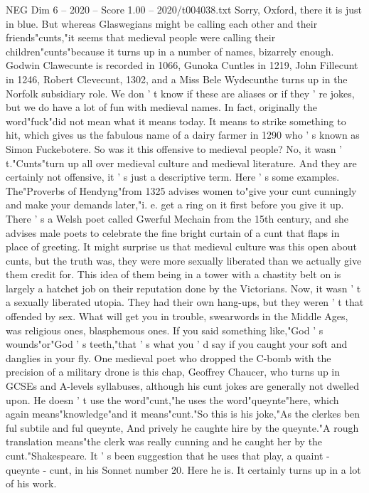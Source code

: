 \begin{textsample}{NEG Dim 6 – 2020 – Score 1.00 – 2020/t004038.txt}
Sorry, Oxford, there it is just in blue.
But whereas Glaswegians might be calling each other and their friends"cunts,"it seems that medieval people were calling their children"cunts"because it turns up in a number of names, bizarrely enough.
Godwin Clawecunte is recorded in 1066, Gunoka Cuntles in 1219, John Fillecunt in 1246, Robert Clevecunt, 1302, and a Miss Bele Wydecunthe turns up in the Norfolk subsidiary role.
We don ' t know if these are aliases or if they ' re jokes, but we do have a lot of fun with medieval names.
In fact, originally the word"fuck"did not mean what it means today.
It means to strike something to hit, which gives us the fabulous name of a dairy farmer in 1290 who ' s known as Simon Fuckebotere.
So was it this offensive to medieval people?
No, it wasn ' t."Cunts"turn up all over medieval culture and medieval literature.
And they are certainly not offensive, it ' s just a descriptive term.
Here ' s some examples.
The"Proverbs of Hendyng"from 1325 advises women to"give your cunt cunningly and make your demands later,"i. e. get a ring on it first before you give it up.
There ' s a Welsh poet called Gwerful Mechain from the 15th century, and she advises male poets to celebrate the fine bright curtain of a cunt that flaps in place of greeting.
It might surprise us that medieval culture was this open about cunts, but the truth was, they were more sexually liberated than we actually give them credit for.
This idea of them being in a tower with a chastity belt on is largely a hatchet job on their reputation done by the Victorians.
Now, it wasn ' t a sexually liberated utopia.
They had their own hang-ups, but they weren ' t that offended by sex.
What will get you in trouble, swearwords in the Middle Ages, was religious ones, blasphemous ones.
If you said something like,"God ' s wounds"or"God ' s teeth,"that ' s what you ' d say if you caught your soft and danglies in your fly.
One medieval poet who dropped the C-bomb with the precision of a military drone is this chap, Geoffrey Chaucer, who turns up in GCSEs and A-levels syllabuses, although his cunt jokes are generally not dwelled upon.
He doesn ' t use the word"cunt,"he uses the word"queynte"here, which again means"knowledge"and it means"cunt."So this is his joke,"As the clerkes ben ful subtile and ful queynte, And prively he caughte hire by the queynte."A rough translation means"the clerk was really cunning and he caught her by the cunt."Shakespeare.
It ' s been suggestion that he uses that play, a quaint - queynte - cunt, in his Sonnet number 20.
Here he is.
It certainly turns up in a lot of his work.

\end{textsample}
